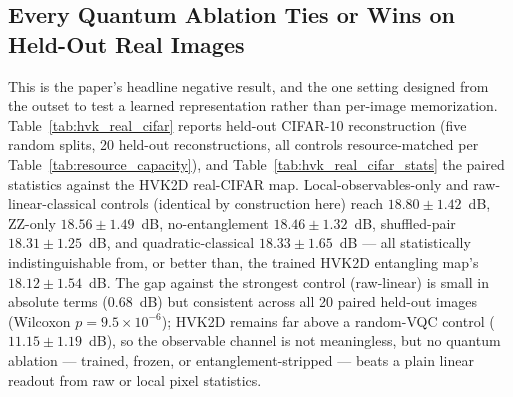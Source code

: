 \documentclass[journal]{IEEEtran}
\begin{document}
\subsection{Every Quantum Ablation Ties or Wins on Held-Out Real Images}
\label{sec:holdout_headline}
This is the paper's headline negative result, and the one setting designed from the outset to test a learned representation rather than per-image memorization. Table~\ref{tab:hvk_real_cifar} reports held-out CIFAR-10 reconstruction (five random splits, 20 held-out reconstructions, all controls resource-matched per Table~\ref{tab:resource_capacity}), and Table~\ref{tab:hvk_real_cifar_stats} the paired statistics against the HVK2D real-CIFAR map. Local-observables-only and raw-linear-classical controls (identical by construction here) reach $18.80\pm1.42$~dB, ZZ-only $18.56\pm1.49$~dB, no-entanglement $18.46\pm1.32$~dB, shuffled-pair $18.31\pm1.25$~dB, and quadratic-classical $18.33\pm1.65$~dB --- all statistically indistinguishable from, or better than, the trained HVK2D entangling map's $18.12\pm1.54$~dB. The gap against the strongest control (raw-linear) is small in absolute terms ($0.68$~dB) but consistent across all 20 paired held-out images (Wilcoxon $p=9.5\times10^{-6}$); HVK2D remains far above a random-VQC control ($11.15\pm1.19$~dB), so the observable channel is not meaningless, but no quantum ablation --- trained, frozen, or entanglement-stripped --- beats a plain linear readout from raw or local pixel statistics.
\end{document}
